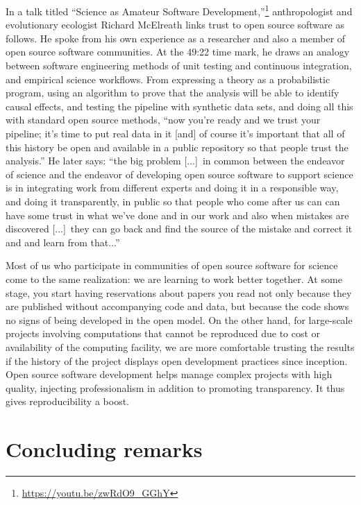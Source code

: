 \documentclass{statement}
\newlength{\up}
\begin{document}
In a talk titled ``Science as Amateur Software Development,''\footnote{\url{https://youtu.be/zwRdO9_GGhY}} anthropologist and evolutionary ecologist Richard McElreath links trust to open source software as follows.
He spoke from his own experience as a researcher and also a member of open source software communities.
At the 49:22 time mark,  he draws an analogy between software engineering methods of unit testing and continuous integration, and empirical science workflows. 
From expressing a theory as a probabilistic program, using an algorithm to prove that the analysis will be able to identify causal effects, and testing the pipeline with synthetic data sets, and doing all this with standard open source methods, ``now you’re ready and we trust your pipeline; it’s time to put real data in it [and] of course it’s important that all of this history be open and available in a public repository so that people trust the analysis.''
He later says:  ``the big problem [...]\ in common between the endeavor of science and the endeavor of developing open source software to support science is in integrating work from different experts and doing it in a responsible way, and doing it transparently, in public so that people who come after us can can have some trust in what we've done and in our work and also when mistakes are discovered [...]\ they can go back and find the source of the mistake and correct it and and learn from that...''

Most of us who participate in communities of open source software for science come to the same realization: we are learning to work better together. 
At some stage, you start having reservations about papers you read not only because they are published without accompanying code and data, but because the code shows no signs of being developed in the open model. 
On the other hand, for large-scale projects involving computations that cannot be reproduced due to cost or availability of the computing facility, we are more comfortable trusting the results if the history of the project displays open development practices since inception.
Open source software development helps manage complex projects with high quality, injecting professionalism in addition to promoting transparency. 
It thus gives reproducibility a boost.


\section*{Concluding remarks}
\vspace{\up}
\end{document}
